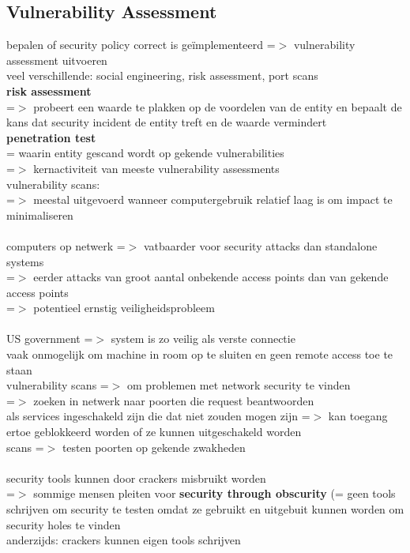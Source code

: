 \documentclass{report}
\begin{document}
\subsection{Vulnerability Assessment}
bepalen of security policy correct is ge\"implementeerd =$>$ vulnerability assessment uitvoeren
\\veel verschillende: social engineering, risk assessment, port scans
\\\textbf{risk assessment} 
\\=$>$ probeert een waarde te plakken op de voordelen van de entity en bepaalt de kans dat security incident de entity treft en de waarde vermindert
\\\textbf{penetration test}
\\= waarin entity gescand wordt op gekende vulnerabilities
\\ =$>$ kernactiviteit van meeste vulnerability assessments
\\vulnerability scans:
\\=$>$ meestal uitgevoerd wanneer computergebruik relatief laag is om impact te minimaliseren
\\
\\computers op netwerk =$>$ vatbaarder voor security attacks dan standalone systems
\\=$>$ eerder attacks van groot aantal onbekende access points dan van gekende access points 
\\=$>$ potentieel ernstig veiligheidsprobleem
\\
\\US government =$>$ system is zo veilig als verste connectie
\\vaak onmogelijk om machine in room op te sluiten en geen remote access toe te staan
\\vulnerability scans =$>$ om problemen met network security te vinden
\\=$>$ zoeken in netwerk naar poorten die request beantwoorden
\\als services ingeschakeld zijn die dat niet zouden mogen zijn =$>$ kan toegang ertoe geblokkeerd worden of ze kunnen uitgeschakeld worden
\\scans =$>$ testen poorten op gekende zwakheden 
\\
\\security tools kunnen door crackers misbruikt worden
\\=$>$ sommige mensen pleiten voor \textbf{security through obscurity} (= geen tools schrijven om security te testen omdat ze gebruikt en uitgebuit kunnen worden om security holes te vinden
\\anderzijds: crackers kunnen eigen tools schrijven
\end{document}
